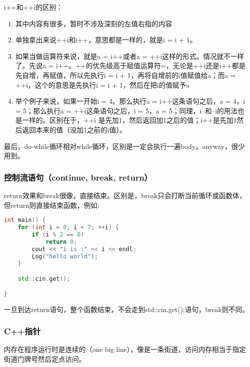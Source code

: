 {\ncodestyle i++}和{\ncodestyle ++i}的区别：

\begin{enumerate}
	\item 其中内容有很多，暂时不涉及深刻的左值右指的内容
	\item 单独拿出来说++i和i++，意思都是一样的，就是i = i + 1。
	\item 如果当做运算符来说，就是a = i++或者a = ++i这样的形式。情况就不一样了。先说a = i++。++的优先级高于赋值运算符=，无论是++i还是i++都是先自增，再赋值，所以先执行i = i + 1，再将自增前的i值赋值给a；而a = ++i，这个的意思是先执行i = i + 1，然后在把i的值赋予a
	\item 举个例子来说，如果一开始i = 4。那么执行a = i++这条语句之后，a = 4，i = 5；那么执行a = ++i这条语句之后，i = 5，a = 5；同理，i--和--i的用法也是一样的。区别在于，++i 是先加1，然后返回加1之后的值；i++是先加1然后返回本来的值（没加1之前的i值）。
\end{enumerate}

最后，{\ncodestyle do-while}循环相对{\ncodestyle while}循环，区别是一定会执行一遍body。anyway，很少用到。

\subsubsection{控制流语句（continue, break, return）}

{\ncodestyle return}效果和{\ncodestyle break}很像，直接结束。区别是，{\ncodestyle break}只会打断当前循环或函数体，但{\ncodestyle return}则直接结束函数，例如:

\begin{lstlisting}[language=C++]
int main() {
    for (int i = 0; i < 7; ++i) {
        if (i % 2 == 0)
            return 0;
        cout << "i is :" << i << endl;
        Log("hello world");
    }

    std::cin.get();

}
\end{lstlisting}

一旦到达{\ncodestyle return}语句，整个函数结束，不会走到{\ncodestyle std::cin.get();}语句，{\ncodestyle break}则不同。

\subsubsection{C++指针}

内存在程序运行时是连续的（one big line），像是一条街道，访问内存相当于指定街道门牌号然后定点访问。

